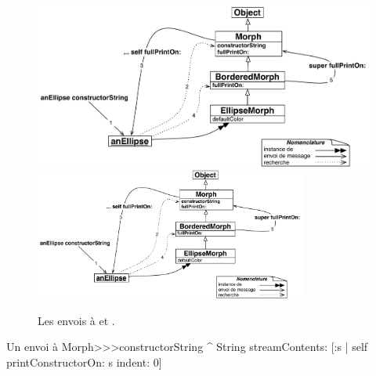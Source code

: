 \documentclass[a4paper,10pt,twoside]{book}
\begin{document}
\begin{figure}[htb]
\begin{center}
\ifluluelse
	{\includegraphics[width=\textwidth]{constructorStringLookup}}
	{\includegraphics[width=0.8\textwidth]{constructorStringLookup}}
\caption{Les envois à \self et \super.}
\end{center}
\end{figure}

\begin{method}[constructorString]{Un envoi à \self}
Morph>>>constructorString
	^ String streamContents: [:s | self printConstructorOn: s indent: 0]
\end{method}

\end{document}

